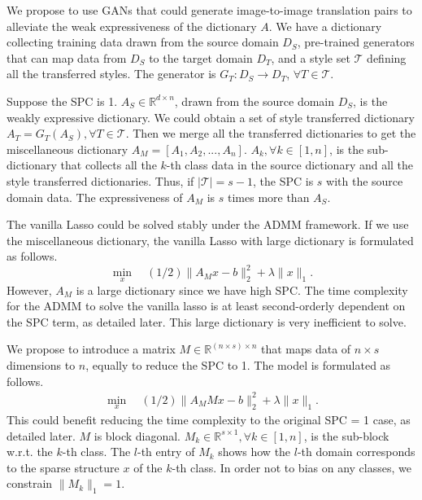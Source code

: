 \documentclass{article}
\begin{document}
We propose to use GANs that could generate image-to-image translation pairs to alleviate the weak expressiveness of the dictionary $A$. We have a dictionary collecting training data drawn from the source domain $D_{S}$, pre-trained generators that can map data from $D_{S}$ to the target domain $D_{T}$, and a style set $\mathcal{T}$ defining all the transferred styles. The generator is $G_T:D_{S} \to D_T$, $\forall T \in \mathcal{T}$.

Suppose the SPC is 1. $A_{S} \in \mathbb{R}^{d \times n}$, drawn from the source domain $D_{S}$, is the weakly expressive dictionary. We could obtain a set of style transferred dictionary $A_{T} = G_{T}(A_S), \forall T \in \mathcal{T}$. Then we merge all the transferred dictionaries to get the miscellaneous dictionary $A_M = [ A_1, A_2, ..., A_n]$. $A_k, \forall k \in [1,n]$, is the sub-dictionary that collects all the $k$-th class data in the source dictionary and all the style transferred dictionaries. Thus, if $| \mathcal{T}|=s-1$, the SPC is $s$ with the source domain data. The expressiveness of $A_M$ is $s$ times more than $A_S$.

The vanilla Lasso could be solved stably under the ADMM framework. If we use the miscellaneous dictionary, the vanilla Lasso with large dictionary is formulated as follows.
\begin{equation}
\label{v_lasso_AM}
\min_x \quad(1/2)\|A_Mx-b\|^2_2+\lambda\|x\|_1.
\end{equation}
However, $A_M$ is a large dictionary since we have high SPC. The time complexity for the ADMM to solve the vanilla lasso is at least second-orderly dependent on the SPC term, as detailed later. This large dictionary is very inefficient to solve.

We propose to introduce a matrix $M \in \mathbb{R}^{(n \times s) \times n}$ that maps data of $n \times s$ dimensions to $n$, equally to reduce the SPC to 1. The model is formulated as follows.
\begin{equation}
\label{v_lasso_AMM}
\begin{split}
\min_x \quad(1/2)\|A_MMx-b\|^2_2+\lambda\|x\|_1.
\end{split}
\end{equation}
This could benefit reducing the time complexity to the original SPC = 1 case, as detailed later. $M$ is block diagonal. $M_k \in \mathbb{R}^{s \times 1}, \forall k \in [1,n]$, is the sub-block w.r.t. the $k$-th class. The $l$-th entry of $M_k$ shows how the $l$-th domain corresponds to the sparse structure $x$ of the $k$-th class. In order not to bias on any classes, we constrain $\|M_k\|_1=1$. 
\end{document}
